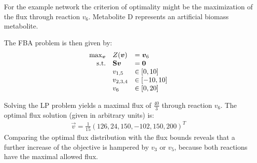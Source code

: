 For the example network the criterion of optimality might be the maximization of the flux through reaction $v_6$. Metabolite D represents an artificial biomass metabolite. 

The FBA problem is then given by:
\begin{align}\label{eq:FBAtoyNw}
	\begin{array}{r l l}
		\max_{\boldsymbol{v}} 	& Z(\boldsymbol{v}) &= \boldsymbol{v}_6\\
		\text{s.t.}	  	& {\bf S} \boldsymbol{v} &=  \boldsymbol{0} \\
				  	&  v_{1,5}  & \in[0,10] \\
					&  v_{2,3,4} & \in [-10,10] \\
					&  v_6  & \in [0, 20] \\
	\end{array}
\end{align}

Solving the LP problem yields a maximal flux of $\frac{40}{3}$ through reaction $v_6$. The optimal flux solution (given in arbitrary units) is:
\begin{align}\label{eq:optToyNw}
 \vec{v} = \frac{1}{15}(126,24,150,-102,150,200)^T
\end{align}
Comparing the optimal flux distribution with the flux bounds reveals that a further increase of the objective is hampered by $v_3$ or $v_5$, because both reactions have the maximal allowed flux. 

